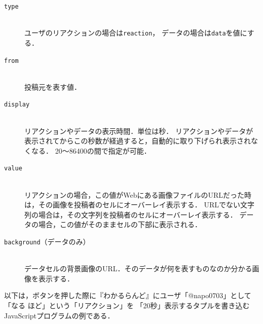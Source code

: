 \vspace{4mm}
\begin{description}
\item[\texttt{type}]\mbox{}\\
ユーザのリアクションの場合は\texttt{reaction}，
データの場合は\texttt{data}を値にする．

\item[\texttt{from}]\mbox{}\\
投稿元を表す値．

\item[\texttt{display}]\mbox{}\\
リアクションやデータの表示時間．単位は秒．
リアクションやデータが表示されてからこの秒数が経過すると，自動的に取り下げられ表示されなくなる．
20〜86400の間で指定が可能．

\item[\texttt{value}]\mbox{}\\
リアクションの場合，この値がWebにある画像ファイルのURLだった時は，その画像を投稿者のセルにオーバーレイ表示する．
URLでない文字列の場合は，その文字列を投稿者のセルにオーバーレイ表示する．
データの場合，この値がそのままセルの下部に表示される．

\item[\texttt{background}（データのみ）]\mbox{}\\
データセルの背景画像のURL．そのデータが何を表すものなのか分かる画像を表示する．
\end{description}
\vspace{4mm}

以下は，ボタンを押した際に『わかるらんど』にユーザ「@napo0703」として「なる ほど」という「リアクション」を
「20秒」表示するタプルを書き込むJavaScriptプログラムの例である．

